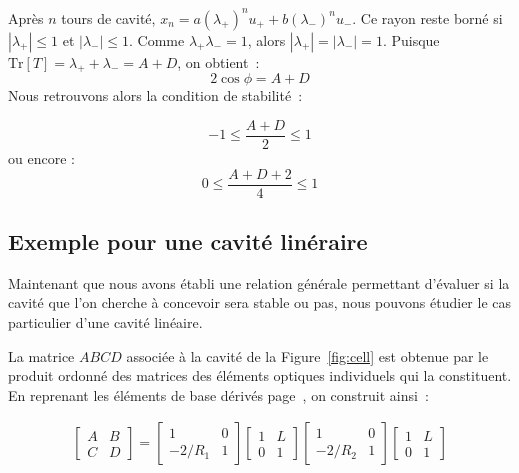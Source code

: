 \documentclass[a4paper]{book}
\newcommand{\Tr}[1]{\mathrm{Tr}\left[{#1}\right]}
\begin{document}
Après $n$ tours de cavité, $x_n = a(\lambda_+)^nu_{+}+b(\lambda_-)^nu_{-}$. Ce rayon reste borné si $|\lambda_+|\leq1$ et $|\lambda_-|\leq1$. Comme $\lambda_{+}\lambda_{-} = 1$, alors $|\lambda_+|=|\lambda_-|=1$. 
Puisque $\Tr{T}=\lambda_+ + \lambda_-=A+D$, on obtient~:
\begin{equation}
    2\cos\phi = A + D
\end{equation}
Nous retrouvons alors la condition de stabilité~:

\begin{equation}
    -1\leq \frac{A+D}{2}\leq 1
\end{equation}
ou encore :
\begin{equation}
    0 \leq \frac{A+D+2}{4}\leq 1
\end{equation}

\subsection{Exemple pour une cavité linéraire}\label{subsec:ex_cavlin}


Maintenant que nous avons établi une relation générale permettant d'évaluer si la cavité que l'on cherche à concevoir sera stable ou pas, nous pouvons étudier le cas particulier d'une cavité linéaire.


La matrice $ABCD$ associée à la cavité de la Figure~\ref{fig:cell} est obtenue par le produit ordonné des matrices des éléments optiques individuels qui la constituent. \\



En reprenant les éléments de base dérivés page~\pageref{subsec:el_base}, on construit ainsi~:

\begin{gather}
  \begin{bmatrix}
   A & B \\
   C & D 
   \end{bmatrix}
   =
  \begin{bmatrix}
   1 & 0 \\
   -2/R_1 & 1 
  \end{bmatrix}
  \begin{bmatrix}
   1 & L \\
   0 & 1 
   \end{bmatrix}
  \begin{bmatrix}
   1 & 0 \\
   -2/R_2 & 1 
  \end{bmatrix}
  \begin{bmatrix}
   1 & L \\
   0 & 1 
   \end{bmatrix}
\end{gather}
\end{document}
